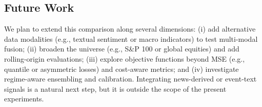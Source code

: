 \documentclass[conference,a4paper]{IEEEtran}
\begin{document}
\subsection*{Future Work}
We plan to extend this comparison along several dimensions: (i) add alternative data modalities (e.g., textual sentiment or macro indicators) to test multi-modal fusion; (ii) broaden the universe (e.g., S\&P 100 or global equities) and add rolling-origin evaluations; (iii) explore objective functions beyond MSE (e.g., quantile or asymmetric losses) and cost-aware metrics; and (iv) investigate regime-aware ensembling and calibration. Integrating news-derived or event-text signals is a natural next step, but it is outside the scope of the present experiments.


{\small


}
\end{document}
